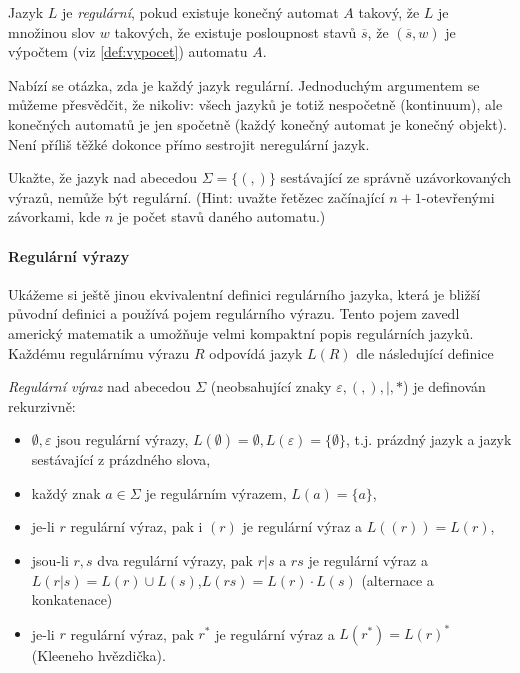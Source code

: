 \begin{theorem} Jazyk \(L\) je \emph{regulární}, pokud existuje konečný automat \(A\) takový, že
\(L\) je množinou slov \(w\) takových, že existuje posloupnost stavů \(\overline{s}\), že \((\overline{s},w)\) je
výpočtem (viz \ref{def:vypocet}) automatu \(A\).
\end{theorem}

Nabízí se otázka, zda je každý jazyk regulární. Jednoduchým argumentem se můžeme přesvědčit, že nikoliv: všech jazyků
je totiž nespočetně (kontinuum), ale konečných automatů je jen spočetně (každý konečný automat je konečný objekt).
Není příliš těžké dokonce přímo sestrojit neregulární jazyk.

\begin{cviceni}\label{cv:zavorky}
Ukažte, že jazyk nad abecedou \(\Sigma=\{(,)\}\) sestávající ze správně uzávorkovaných výrazů, nemůže
být regulární.  (Hint: uvažte řetězec začínající \(n+1\)-otevřenými závorkami, kde \(n\) je počet stavů daného automatu.)
\end{cviceni}

\paragraph{Regulární výrazy}
Ukážeme si ještě jinou ekvivalentní definici regulárního jazyka, která je bližší původní definici a používá pojem regulárního výrazu.
Tento pojem zavedl americký matematik  a umožňuje velmi kompaktní popis regulárních jazyků. Každému regulárnímu
výrazu \(R\) odpovídá jazyk \(L(R)\) dle následující definice

\begin{definition} \emph{Regulární výraz} nad abecedou \(\Sigma\)
(neobsahující znaky \(\varepsilon,(,),|,*\)) je definován rekurzivně:
\begin{itemize}
 \item \(\emptyset, \varepsilon\) jsou regulární výrazy, \(L(\emptyset)=\emptyset, L(\varepsilon) = \{\emptyset\}\),  t.j. prázdný jazyk a jazyk sestávající z prázdného slova,
 \item každý znak \(a\in\Sigma\) je regulárním výrazem, \(L(a) = \{a\}\),
 \item je-li \(r\) regulární výraz, pak i \((r)\) je regulární výraz a \(L((r)) = L(r)\),
 \item jsou-li \(r,s\) dva regulární výrazy, pak \(r|s\) a \(rs\) je regulární výraz a \(L(r|s)=L(r)\cup L(s)\),\(L(rs)=L(r)\cdot L(s)\) (alternace a konkatenace)
 \item je-li \(r\) regulární výraz, pak \(r^*\) je regulární výraz a \(L(r^*) = L(r)^*\) (Kleeneho hvězdička).
\end{itemize}
\end{definition}

